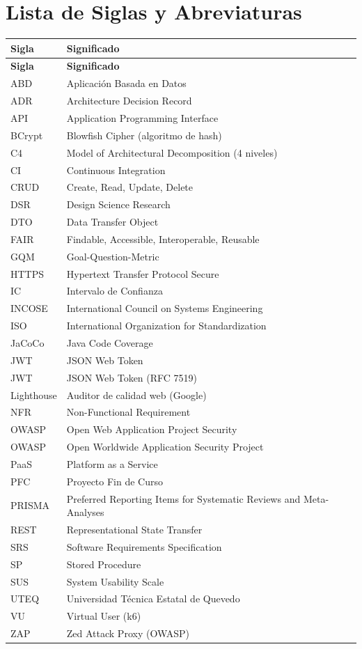 \chapter*{Lista de Siglas y Abreviaturas}

\begin{longtable}{@{}p{4cm}p{10cm}@{}}
\toprule
\textbf{Sigla} & \textbf{Significado} \\
\midrule
\endfirsthead
\toprule
\textbf{Sigla} & \textbf{Significado} \\
\midrule
\endhead
ABD & Aplicación Basada en Datos \\
ADR & Architecture Decision Record \\
API & Application Programming Interface \\
BCrypt & Blowfish Cipher (algoritmo de hash) \\
C4 & Model of Architectural Decomposition (4 niveles) \\
CI & Continuous Integration \\
CRUD & Create, Read, Update, Delete \\
DSR & Design Science Research \\
DTO & Data Transfer Object \\
FAIR & Findable, Accessible, Interoperable, Reusable \\
GQM & Goal-Question-Metric \\
HTTPS & Hypertext Transfer Protocol Secure \\
IC & Intervalo de Confianza \\
INCOSE & International Council on Systems Engineering \\
ISO & International Organization for Standardization \\
JaCoCo & Java Code Coverage \\
JWT & JSON Web Token \\
JWT & JSON Web Token (RFC 7519) \\
Lighthouse & Auditor de calidad web (Google) \\
NFR & Non-Functional Requirement \\
OWASP & Open Web Application Project Security \\
OWASP & Open Worldwide Application Security Project \\
PaaS & Platform as a Service \\
PFC & Proyecto Fin de Curso \\
PRISMA & Preferred Reporting Items for Systematic Reviews and Meta-Analyses \\
REST & Representational State Transfer \\
SRS & Software Requirements Specification \\
SP & Stored Procedure \\
SUS & System Usability Scale \\
UTEQ & Universidad Técnica Estatal de Quevedo \\
VU & Virtual User (k6) \\
ZAP & Zed Attack Proxy (OWASP) \\
\bottomrule
\end{longtable}
